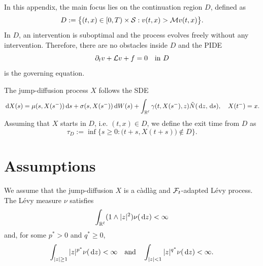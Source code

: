 In this appendix, the main focus lies on the continuation region $D$, defined as 
\begin{equation}
    D := \big\{ (t,x) \in [0,T) \times \mathcal{S}: v(t,x) > \mathcal{M} v(t,x) \big\}.
    \label{eqn: continuation region}
\end{equation}
In $D$, an intervention is suboptimal and the process evolves freely without any intervention. Therefore, there are no obstacles inside $D$ and the PIDE
\begin{equation*}
    \partial_t v + \mathcal{L} v + f = 0 \quad \text{in } D
\end{equation*}
is the governing equation. 

The jump-diffusion process $X$ follows the SDE
\begin{equation}
    \,\mathrm{d} X(s) = \mu(s,X(s^-)) \,\mathrm{d} s + \sigma(s,X(s^-)) \,\mathrm{d} W(s) + \int_{\mathbb{R}^\ell} \gamma(t,X(s^-),z) \tilde N(\,\mathrm{d} z, \,\mathrm{d} s), \quad X(t^-)=x. 
    \label{C: SDE}
\end{equation}
Assuming that $X$ starts in $D$, i.e. $(t,x) \in D$, we define the exit time from $D$ as
\begin{equation}
    \tau_D := \inf \big\{ s \geq 0: \big(t+s, X(t+s)\big) \notin D \big\}.
    \label{eqn: tau_D}
\end{equation}

\section{Assumptions}
\label{appendix: Assumptions}
We assume that the jump-diffusion $X$ is a càdlàg and $\mathcal{F}_t$-adapted Lévy process. The Lévy measure $\nu$ satisfies 
\begin{equation*}
    \int_{\mathbb{R}^\ell} (1 \wedge |z|^2) \nu(\,\mathrm{d} z) < \infty
\end{equation*}
and, for some $p^*>0$ and $q^*\geq 0$,
\begin{equation}
    \int_{|z|\geq 1}|z|^{p^*} \nu(\,\mathrm{d} z) < \infty \quad \text{and} \quad \int_{|z|<1} |z|^{q^*} \nu(\,\mathrm{d} z) < \infty.
    \label{C: p and q assumption}
\end{equation}

